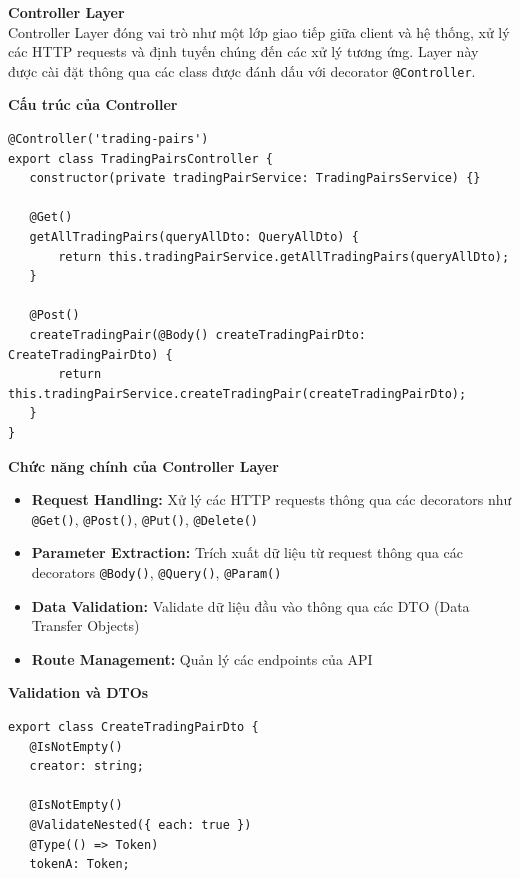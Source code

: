 \begin{description}
    \item \textbf{Controller Layer} \\
          Controller Layer đóng vai trò như một lớp giao tiếp giữa client và hệ thống, xử
          lý các HTTP requests và định tuyến chúng đến các xử lý tương ứng. Layer này
          được cài đặt thông qua các class được đánh dấu với decorator
          \texttt{@Controller}.

          \textbf{Cấu trúc của Controller}
          \begin{lstlisting}
@Controller('trading-pairs')
export class TradingPairsController {
   constructor(private tradingPairService: TradingPairsService) {}

   @Get()
   getAllTradingPairs(queryAllDto: QueryAllDto) {
       return this.tradingPairService.getAllTradingPairs(queryAllDto);
   }

   @Post() 
   createTradingPair(@Body() createTradingPairDto: CreateTradingPairDto) {
       return this.tradingPairService.createTradingPair(createTradingPairDto);
   }
}
\end{lstlisting}

          \textbf{Chức năng chính của Controller Layer}
          \begin{itemize}
              \item \textbf{Request Handling:} Xử lý các HTTP requests thông qua các
                    decorators như \texttt{@Get()}, \texttt{@Post()}, \texttt{@Put()},
                    \texttt{@Delete()}
              \item \textbf{Parameter Extraction:} Trích xuất dữ liệu từ request thông qua
                    các decorators \texttt{@Body()}, \texttt{@Query()}, \texttt{@Param()}
              \item \textbf{Data Validation:} Validate dữ liệu đầu vào thông qua các DTO
                    (Data Transfer Objects)
              \item \textbf{Route Management:} Quản lý các endpoints của API
          \end{itemize}

          \textbf{Validation và DTOs} \\
          \begin{lstlisting}
export class CreateTradingPairDto {
   @IsNotEmpty()
   creator: string;

   @IsNotEmpty()
   @ValidateNested({ each: true })
   @Type(() => Token)
   tokenA: Token;


\end{lstlisting}
\end{description}
